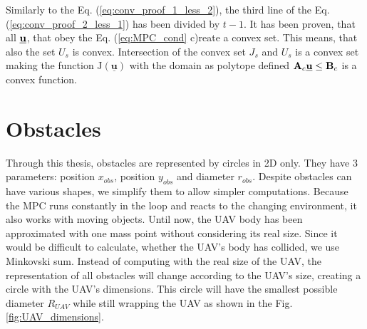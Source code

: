 \documentclass[a4paper,11pt,titlepage]{article}
\newcommand{\uvec}{\textbf{\underline{u}}}
\begin{document}
Similarly to the Eq. (\ref{eq:conv_proof_1_less_2}), the third line of the Eq. (\ref{eq:conv_proof_2_less_1}) has been divided by $t-1$. 
It has been proven, that all $\uvec$, that obey the Eq. (\ref{eq:MPC_cond} c)reate a convex set. This means, that also the set $U_s$ is convex. Intersection of the convex set $J_s$ and $U_s$ is a convex set making the function $\mathrm{J}(\underline{\textbf{u}})$ with the domain as polytope defined $\textbf{A}_c \uvec \leq \textbf{B}_c$ is a convex function.

\section{Obstacles}
Through this thesis, obstacles are represented by circles in 2D only. They have 3 parameters: position $x_{obs}$, position $y_{obs}$ and diameter $r_{obs}$. Despite obstacles can have various shapes, we simplify them to allow simpler computations. Because the MPC runs constantly in the loop and reacts to the changing environment, it also works with moving objects. Until now, the UAV body has been approximated with one mass point without considering its real size. Since it would be difficult to calculate, whether the UAV's body has collided, we use Minkovski sum. Instead of computing with the real size of the UAV, the representation of all obstacles will change according to the UAV's size, creating a circle with the UAV's dimensions. This circle will have the smallest possible diameter $R_{UAV}$ while still wrapping the UAV as shown in the Fig. \ref{fig:UAV_dimensions}. 
\end{document}
